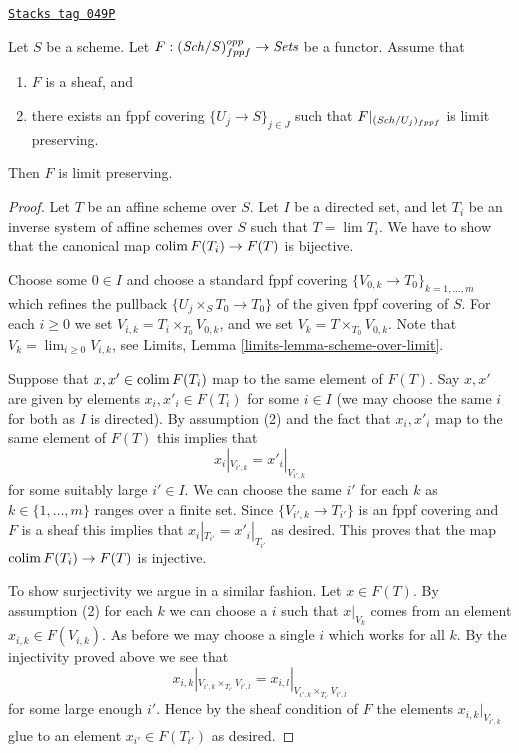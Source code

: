 \begin{lemma}
\label{spaces-limits-lemma-sheaf-finite-presentation}
\href{https://stacks.math.columbia.edu/tag/049P}{\texttt{Stacks tag 049P}}

Let $S$ be a scheme.
Let $F : (\mathit{Sch}/S)_{fppf}^{opp} \to \textit{Sets}$ be a functor.
Assume that
\begin{enumerate}
\item $F$ is a sheaf, and
\item there exists an fppf covering $\{U_j \to S\}_{j \in J}$ such that
$F|_{(\mathit{Sch}/U_j)_{fppf}}$ is limit preserving.
\end{enumerate}
Then $F$ is limit preserving.
\end{lemma}

\begin{proof}
Let $T$ be an affine scheme over $S$.
Let $I$ be a directed set, and let
$T_i$ be an inverse system of affine schemes over $S$ such that
$T = \lim T_i$. We have to show that the canonical
map $\operatorname{colim} F(T_i) \to F(T)$ is bijective.

\medskip\noindent
Choose some $0 \in I$ and choose a standard fppf covering
$\{V_{0, k} \to T_{0}\}_{k = 1, \ldots, m}$ which refines
the pullback $\{U_j \times_S T_0 \to T_0\}$ of the given fppf covering of $S$.
For each $i \geq 0$ we set $V_{i, k} = T_i \times_{T_0} V_{0, k}$, and
we set $V_k = T \times_{T_0} V_{0, k}$. Note that
$V_k = \lim_{i \geq 0} V_{i, k}$, see
Limits, Lemma \ref{limits-lemma-scheme-over-limit}.

\medskip\noindent
Suppose that $x, x' \in \operatorname{colim} F(T_i)$ map to the same
element of $F(T)$. Say $x, x'$ are given by elements $x_i, x'_i \in F(T_i)$
for some $i \in I$ (we may choose the same $i$ for both as $I$ is directed).
By assumption (2) and the fact that $x_i, x'_i$ map to the same element
of $F(T)$ this implies that
$$
x_i|_{V_{i', k}} = x'_i|_{V_{i', k}}
$$
for some suitably large $i' \in I$. We can choose the same $i'$ for each
$k$ as $k \in \{1, \ldots, m\}$ ranges over a finite set.
Since $\{V_{i', k} \to T_{i'}\}$
is an fppf covering and $F$ is a sheaf this implies that
$x_i|_{T_{i'}} = x'_i|_{T_{i'}}$ as desired. This proves that the map
$\operatorname{colim} F(T_i) \to F(T)$ is injective.

\medskip\noindent
To show surjectivity we argue in a similar fashion.
Let $x \in F(T)$. By assumption (2) for each $k$ we
can choose a $i$ such that $x|_{V_k}$ comes from an
element $x_{i, k} \in F(V_{i, k})$. As before we may choose a
single $i$ which works for all $k$. By the injectivity
proved above we see that
$$
x_{i, k}|_{V_{i', k} \times_{T_{i'}} V_{i', l}}
=
x_{i, l}|_{V_{i', k} \times_{T_{i'}} V_{i', l}}
$$
for some large enough $i'$. Hence by the sheaf condition of $F$
the elements $x_{i, k}|_{V_{i', k}}$ glue to an element $x_{i'} \in F(T_{i'})$
as desired.
\end{proof}

